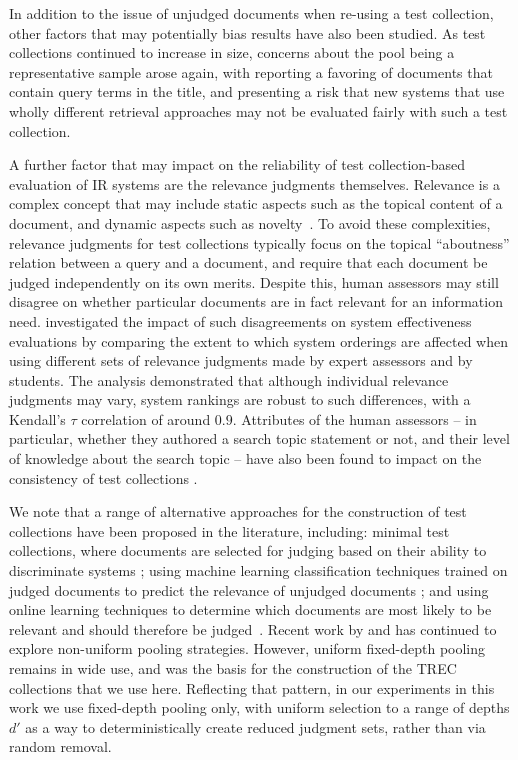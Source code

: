 In addition to the issue of unjudged documents when re-using a test
collection, other factors that may potentially bias results have also
been studied.
As test collections continued to increase in size, concerns about the
pool being a representative sample arose again, with
{\citet{bdsv07irj}} reporting a favoring of documents that contain
query terms in the title, and presenting a risk that new systems that
use wholly different retrieval approaches may not be evaluated fairly
with such a test collection.

A further factor that may impact on the reliability of test
collection-based evaluation of IR systems are the relevance
judgments themselves.
Relevance is a complex concept that may include static aspects such
as the topical content of a document, and dynamic aspects such
as novelty~{\citep{mizzaro07jasist}}.
To avoid these complexities, relevance judgments for test
collections typically focus on the topical ``aboutness'' relation
between a query and a document, and require that each document be
judged independently on its own merits.
Despite this, human assessors may still disagree on whether
particular documents are in fact relevant for an information need.
{\citet{voorhees2000ipm}} investigated the impact of such
disagreements on system effectiveness evaluations by comparing the
extent to which system orderings are affected when using different
sets of relevance judgments made by expert assessors and by
students.
The analysis demonstrated that although individual relevance
judgments may vary, system rankings are robust to such differences,
with a Kendall's $\tau$ correlation of around $0.9$.
Attributes of the human assessors -- in particular, whether they
authored a search topic statement or not, and their level of
knowledge about the search topic -- have also been found to impact on
the consistency of test collections {\citep{bcstvy08sigir}}.

We note that a range of alternative approaches for the construction
of test collections have been proposed in the literature, including:
minimal test collections, where documents are selected for judging
based on their ability to discriminate systems
{\citep{cas06sigir,mwz07sigir,carterette07sigir}}; using machine
learning classification techniques trained on judged documents to
predict the relevance of unjudged documents {\citep{bcys07sigir}};
and using online learning techniques to determine which documents are
most likely to be relevant and should therefore be
judged~{\citep{aps03cikm}}.
Recent work by {\citet{lpb17ipm}} and
{\citet{llpzh17sac,lplpzh17ecir}} has continued to explore
non-uniform pooling strategies.
However, uniform fixed-depth pooling remains in wide use, and was the
basis for the construction of the TREC collections that we use here.
Reflecting that pattern, in our experiments in this work we use
fixed-depth pooling only, with uniform selection to a range of depths
$d'$ as a way to deterministically create reduced judgment sets, rather
than via random removal.

